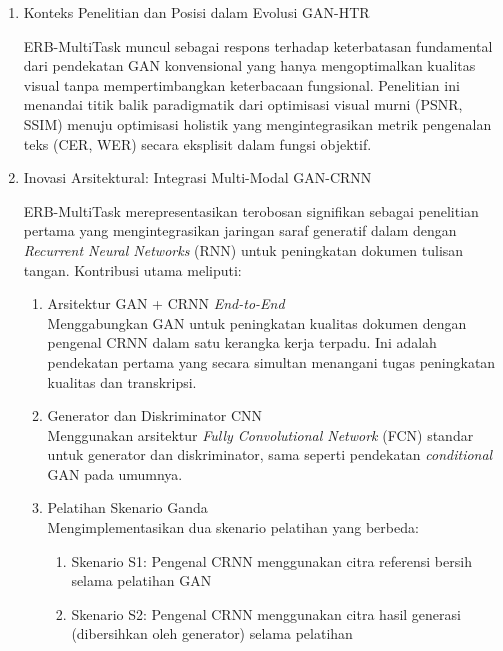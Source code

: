 \begin{enumerate}[leftmargin=*, labelindent=0pt, itemsep=1ex, topsep=0pt]

\item Konteks Penelitian dan Posisi dalam Evolusi GAN-HTR
\label{para:erb-konteks}

ERB-MultiTask muncul sebagai respons terhadap keterbatasan fundamental dari pendekatan GAN konvensional yang hanya mengoptimalkan kualitas visual tanpa mempertimbangkan keterbacaan fungsional. Penelitian ini menandai titik balik paradigmatik dari optimisasi visual murni (PSNR, SSIM) menuju optimisasi holistik yang mengintegrasikan metrik pengenalan teks (CER, WER) secara eksplisit dalam fungsi objektif.

\item Inovasi Arsitektural: Integrasi Multi-Modal GAN-CRNN
\label{para:erb-inovasi}

ERB-MultiTask merepresentasikan terobosan signifikan sebagai penelitian pertama yang mengintegrasikan jaringan saraf generatif dalam dengan \textit{Recurrent Neural Networks} (RNN) untuk peningkatan dokumen tulisan tangan. Kontribusi utama meliputi:

\begin{enumerate}[leftmargin=1.5em, labelsep=0.5em, itemindent=0pt, noitemsep, topsep=0pt, label=\alph*.]
      \item Arsitektur GAN + CRNN \textit{End-to-End} \mbox{}\\[0.1em]
            Menggabungkan GAN untuk peningkatan kualitas dokumen dengan pengenal CRNN dalam satu kerangka kerja terpadu. Ini adalah pendekatan pertama yang secara simultan menangani tugas peningkatan kualitas dan transkripsi.

      \item Generator dan Diskriminator CNN \mbox{}\\[0.1em]
            Menggunakan arsitektur \textit{Fully Convolutional Network} (FCN) standar untuk generator dan diskriminator, sama seperti pendekatan \textit{conditional} GAN pada umumnya.

      \item Pelatihan Skenario Ganda \mbox{}\\[0.1em]
            Mengimplementasikan dua skenario pelatihan yang berbeda:
            \begin{enumerate}[leftmargin=1.5em, labelsep=0.5em, itemindent=0pt, noitemsep, topsep=0pt, label=\alph*.]
                  \item Skenario S1: Pengenal CRNN menggunakan citra referensi bersih selama pelatihan GAN
                  \item Skenario S2: Pengenal CRNN menggunakan citra hasil generasi (dibersihkan oleh generator) selama pelatihan
            \end{enumerate}


\end{enumerate}
\end{enumerate}
